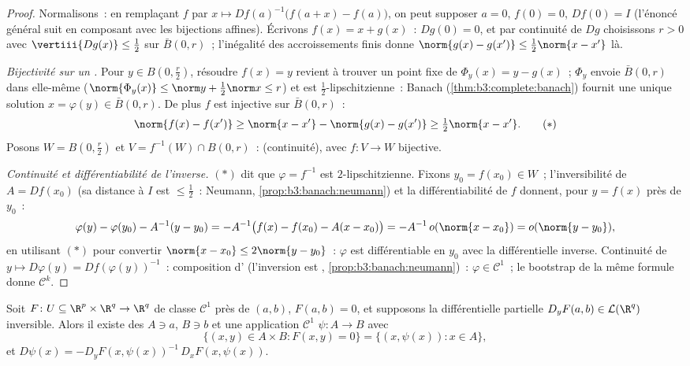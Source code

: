 \begin{proof}
Normalisons~: en remplaçant $f$ par $x \mapsto Df(a)^{-1}\bigl(f(a +
x) - f(a)\bigr)$, on peut supposer $a = 0$, $f(0) = 0$, $Df(0) =
I$ (l'énoncé général suit en composant avec les bijections
affines). Écrivons $f(x) = x + g(x)$~: $Dg(0) = 0$, et par
continuité de $Dg$ choisissons $r > 0$ avec
$\vertiii{Dg(x)} \leq \frac12$ sur $\bar B(0, r)$~; l'inégalité
des accroissements finis donne $\norm{g(x) - g(x')} \leq \frac12
\norm{x - x'}$ là.

\emph{Bijectivité sur un .} Pour $y \in B(0,
\frac r2)$, résoudre $f(x) = y$ revient à trouver un point fixe
de $\Phi_y(x) = y - g(x)$~; $\Phi_y$ envoie $\bar B(0, r)$ dans
elle-même ($\norm{\Phi_y(x)} \leq \norm y + \frac12\norm x \leq
r$) et est $\frac12$-lipschitzienne~: Banach
(\cref{thm:b3:complete:banach}) fournit une unique solution
$x = \varphi(y) \in \bar B(0,r)$. De plus $f$ est injective
sur $\bar B(0,r)$~:
\[
\norm{f(x) - f(x')} \geq \norm{x - x'} - \norm{g(x) - g(x')}
\geq \tfrac12\norm{x - x'} .
\tag{$*$}
\]
Posons $W = B(0, \frac r2)$ et $V = f^{-1}(W)\cap B(0, r)$~:
 (continuité), avec $f \colon V \to W$ bijective.

\emph{Continuité et différentiabilité de l'inverse.} $(*)$
dit que $\varphi = f^{-1}$ est $2$-lipschitzienne. Fixons $y_0 = f(x_0)
\in W$~; l'inversibilité de $A = Df(x_0)$ (sa distance à $I$
est $\leq \frac12$~: Neumann,
\cref{prop:b3:banach:neumann}) et la différentiabilité de $f$
donnent, pour $y = f(x)$ près de $y_0$~:
\[
\varphi(y) - \varphi(y_0) - A^{-1}(y - y_0)
= -A^{-1}\bigl(f(x) - f(x_0) - A(x - x_0)\bigr)
= -A^{-1}\,o(\norm{x - x_0}) = o(\norm{y - y_0}),
\]
en utilisant $(*)$ pour convertir $\norm{x - x_0} \leq 2\norm{y - y_0}$~:
$\varphi$ est différentiable en $y_0$ avec la différentielle
inverse. Continuité de $y \mapsto D\varphi(y) =
Df(\varphi(y))^{-1}$~: composition d'
(l'inversion est ,
\cref{prop:b3:banach:neumann})~: $\varphi \in \mathcal C^1$~;
le bootstrap de la même formule donne $\mathcal C^k$.
\end{proof}

\begin{theorem}
\label{thm:b3:submanifolds:implicit}
Soit $F \colon U \subseteq \R^p\times\R^q \to \R^q$ de classe
$\mathcal C^1$ près de $(a, b)$, $F(a,b) = 0$, et supposons la
différentielle partielle $D_yF(a,b) \in \mathcal L(\R^q)$
inversible. Alors il existe des  $A \ni a$, $B \ni b$
et une application $\mathcal C^1$ $\psi \colon A \to B$ avec
\[
\bigl\{(x, y)\in A\times B : F(x,y) = 0\bigr\}
= \{(x, \psi(x)) : x \in A\},
\]
et $D\psi(x) = -D_yF(x, \psi(x))^{-1}\,D_xF(x,
\psi(x))$.
\end{theorem}

